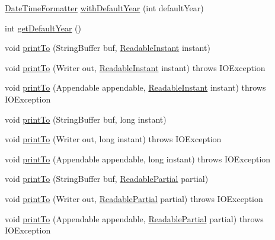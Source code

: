 \begin{DoxyCompactItemize}
\hyperlink{classorg_1_1joda_1_1time_1_1format_1_1_date_time_formatter}{Date\-Time\-Formatter} \hyperlink{classorg_1_1joda_1_1time_1_1format_1_1_date_time_formatter_a7ba9bb6d21f67d3f1a223802d4d83aeb}{with\-Default\-Year} (int default\-Year)
\item 
int \hyperlink{classorg_1_1joda_1_1time_1_1format_1_1_date_time_formatter_ad0b725acb6cb3578a4b02345c2a872e1}{get\-Default\-Year} ()
\item 
void \hyperlink{classorg_1_1joda_1_1time_1_1format_1_1_date_time_formatter_a59bd660039343c63544bf320ebfdb216}{print\-To} (String\-Buffer buf, \hyperlink{interfaceorg_1_1joda_1_1time_1_1_readable_instant}{Readable\-Instant} instant)
\item 
void \hyperlink{classorg_1_1joda_1_1time_1_1format_1_1_date_time_formatter_ab1d9e7d972fd0c1662a426a9f4a46576}{print\-To} (Writer out, \hyperlink{interfaceorg_1_1joda_1_1time_1_1_readable_instant}{Readable\-Instant} instant)  throws I\-O\-Exception 
\item 
void \hyperlink{classorg_1_1joda_1_1time_1_1format_1_1_date_time_formatter_a554c75a85562826221cb7c36a0d2ca2e}{print\-To} (Appendable appendable, \hyperlink{interfaceorg_1_1joda_1_1time_1_1_readable_instant}{Readable\-Instant} instant)  throws I\-O\-Exception 
\item 
void \hyperlink{classorg_1_1joda_1_1time_1_1format_1_1_date_time_formatter_a9600dec72add69fb3cdb8ec1af24bd94}{print\-To} (String\-Buffer buf, long instant)
\item 
void \hyperlink{classorg_1_1joda_1_1time_1_1format_1_1_date_time_formatter_ae0d8371b5044863e469e80dc7f60d923}{print\-To} (Writer out, long instant)  throws I\-O\-Exception 
\item 
void \hyperlink{classorg_1_1joda_1_1time_1_1format_1_1_date_time_formatter_a430b4c83cace843ba132f05fbf26168e}{print\-To} (Appendable appendable, long instant)  throws I\-O\-Exception 
\item 
void \hyperlink{classorg_1_1joda_1_1time_1_1format_1_1_date_time_formatter_a80050405a4dd891eec22e71f3ba276d7}{print\-To} (String\-Buffer buf, \hyperlink{interfaceorg_1_1joda_1_1time_1_1_readable_partial}{Readable\-Partial} partial)
\item 
void \hyperlink{classorg_1_1joda_1_1time_1_1format_1_1_date_time_formatter_a6adca44485462e9a1985a0d6d8c45cbc}{print\-To} (Writer out, \hyperlink{interfaceorg_1_1joda_1_1time_1_1_readable_partial}{Readable\-Partial} partial)  throws I\-O\-Exception 
\item 
void \hyperlink{classorg_1_1joda_1_1time_1_1format_1_1_date_time_formatter_ae6689dac14be73cb67bac8f2682e19d6}{print\-To} (Appendable appendable, \hyperlink{interfaceorg_1_1joda_1_1time_1_1_readable_partial}{Readable\-Partial} partial)  throws I\-O\-Exception 

\end{DoxyCompactItemize}

